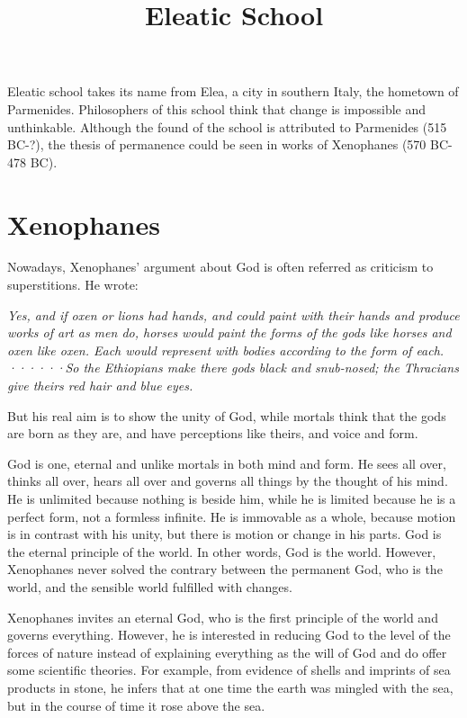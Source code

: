 \documentclass[11pt]{article}
\title{Eleatic School}
\date{}
\begin{document}
  \maketitle

  \linenumbers

Eleatic school takes its name from Elea, a city in southern Italy, the hometown of Parmenides. 
Philosophers of this school think that change is impossible and unthinkable. 
Although the found of the school is attributed to Parmenides (515 BC-?), the thesis of permanence could be seen in works of Xenophanes (570 BC-478 BC).

\section{Xenophanes}
Nowadays, Xenophanes’ argument about God is often referred as criticism to superstitions. 
He wrote: 

\textit{Yes, and if oxen or lions had hands, and could paint with their hands and produce works of art as men do, horses would paint the forms of the gods like horses and oxen like oxen. Each would represent with bodies according to the form of each. ······So the Ethiopians make there gods black and snub-nosed; the Thracians give theirs red hair and blue eyes.}

But his real aim is to show the unity of God, while mortals think that the gods are born as they are, and have perceptions like theirs, and voice and form. 

\newline

God is one, eternal and unlike mortals in both mind and form. 
He sees all over, thinks all over, hears all over and governs all things by the thought of his mind. 
He is unlimited because nothing is beside him, while he is limited because he is a perfect form, not a formless infinite. 
He is immovable as a whole, because motion is in contrast with his unity, but there is motion or change in his parts. 
God is the eternal principle of the world. 
In other words, God is the world. 
However, Xenophanes never solved the contrary between the permanent God, who is the world, and the sensible world fulfilled with changes.

\newline

Xenophanes invites an eternal God, who is the first principle of the world and governs everything. 
However, he is interested in reducing God to the level of the forces of nature instead of explaining everything as the will of God and do offer some scientific theories. 
For example, from evidence of shells and imprints of sea products in stone, he infers that at one time the earth was mingled with the sea, but in the course of time it rose above the sea.
  
\end{document}
